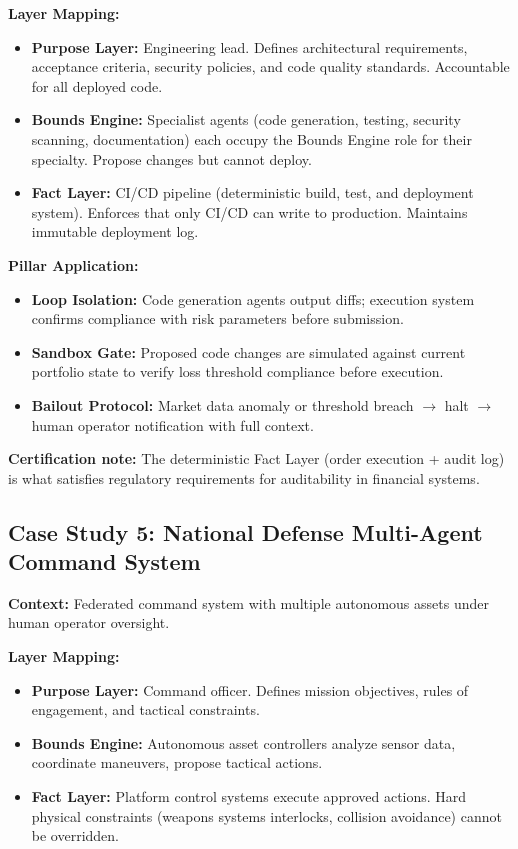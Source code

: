 \documentclass[12pt]{article}
\begin{document}
\textbf{Layer Mapping:}
\begin{itemize}
\item \textbf{Purpose Layer:} Engineering lead. Defines architectural requirements, acceptance criteria, security policies, and code quality standards. Accountable for all deployed code.
\item \textbf{Bounds Engine:} Specialist agents (code generation, testing, security scanning, documentation) each occupy the Bounds Engine role for their specialty. Propose changes but cannot deploy.
\item \textbf{Fact Layer:} CI/CD pipeline (deterministic build, test, and deployment system). Enforces that only CI/CD can write to production. Maintains immutable deployment log.
\end{itemize}

\textbf{Pillar Application:}
\begin{itemize}
\item \textbf{Loop Isolation:} Code generation agents output diffs; execution system confirms compliance with risk parameters before submission.
\item \textbf{Sandbox Gate:} Proposed code changes are simulated against current portfolio state to verify loss threshold compliance before execution.
\item \textbf{Bailout Protocol:} Market data anomaly or threshold breach $\rightarrow$ halt $\rightarrow$ human operator notification with full context.
\end{itemize}

\textbf{Certification note:} The deterministic Fact Layer (order execution + audit log) is what satisfies regulatory requirements for auditability in financial systems.

\subsection{Case Study 5: National Defense Multi-Agent Command System}
\textbf{Context:} Federated command system with multiple autonomous assets under human operator oversight.

\textbf{Layer Mapping:}
\begin{itemize}
\item \textbf{Purpose Layer:} Command officer. Defines mission objectives, rules of engagement, and tactical constraints.
\item \textbf{Bounds Engine:} Autonomous asset controllers analyze sensor data, coordinate maneuvers, propose tactical actions.
\item \textbf{Fact Layer:} Platform control systems execute approved actions. Hard physical constraints (weapons systems interlocks, collision avoidance) cannot be overridden.
\end{itemize}
\end{document}
